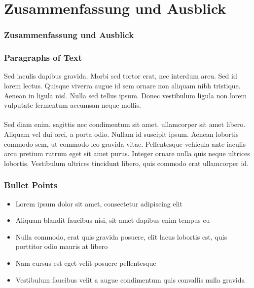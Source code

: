 \documentclass{beamer}
\begin{document}
\section{Zusammenfassung und Ausblick}

\begin{frame}
	\frametitle{Zusammenfassung und Ausblick}
\end{frame}


\begin{frame}
	\frametitle{Paragraphs of Text}
	Sed iaculis dapibus gravida. Morbi sed tortor erat, nec interdum arcu. Sed id lorem lectus. Quisque viverra augue id sem ornare non aliquam nibh tristique. Aenean in ligula nisl. Nulla sed tellus ipsum. Donec vestibulum ligula non lorem vulputate fermentum accumsan neque mollis.\\~\\
	
	Sed diam enim, sagittis nec condimentum sit amet, ullamcorper sit amet libero. Aliquam vel dui orci, a porta odio. Nullam id suscipit ipsum. Aenean lobortis commodo sem, ut commodo leo gravida vitae. Pellentesque vehicula ante iaculis arcu pretium rutrum eget sit amet purus. Integer ornare nulla quis neque ultrices lobortis. Vestibulum ultrices tincidunt libero, quis commodo erat ullamcorper id.
\end{frame}

\begin{frame}
	\frametitle{Bullet Points}
	\begin{itemize}
		\item Lorem ipsum dolor sit amet, consectetur adipiscing elit
		\item Aliquam blandit faucibus nisi, sit amet dapibus enim tempus eu
		\item Nulla commodo, erat quis gravida posuere, elit lacus lobortis est, quis porttitor odio mauris at libero
		\item Nam cursus est eget velit posuere pellentesque
		\item Vestibulum faucibus velit a augue condimentum quis convallis nulla gravida
	\end{itemize}
\end{frame}
\end{document}
